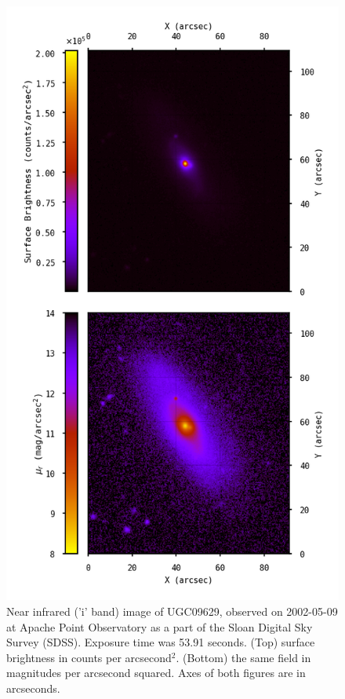 \begin{figure}
  \centering
  \includegraphics[width=1\columnwidth]{images/flux_mag_plot.png}  %
\caption{\small Near infrared ('i' band) image of UGC09629, observed on 2002-05-09 at Apache Point Observatory as a part of the Sloan Digital Sky Survey (SDSS). Exposure time was 53.91 seconds. (Top) surface brightness in counts per arcsecond$^2$. (Bottom) the same field in magnitudes per arcsecond squared. Axes of both figures are in arcseconds.}
  \label{fig:1}
\end{figure}

